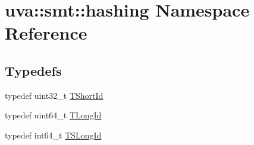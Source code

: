 \hypertarget{namespaceuva_1_1smt_1_1hashing}{}\section{uva\+:\+:smt\+:\+:hashing Namespace Reference}
\label{namespaceuva_1_1smt_1_1hashing}
\subsection*{Typedefs}
\begin{DoxyCompactItemize}
\item 
typedef uint32\+\_\+t \hyperlink{namespaceuva_1_1smt_1_1hashing_adcf22e1982ad09d3a63494c006267469}{T\+Short\+Id}
\item 
typedef uint64\+\_\+t \hyperlink{namespaceuva_1_1smt_1_1hashing_a5992ac0dea0fb3226fb403ede09fad55}{T\+Long\+Id}
\item 
typedef int64\+\_\+t \hyperlink{namespaceuva_1_1smt_1_1hashing_a21827cb807d3f4d2fff506f1e5db5a3c}{T\+S\+Long\+Id}
\end{DoxyCompactItemize}
